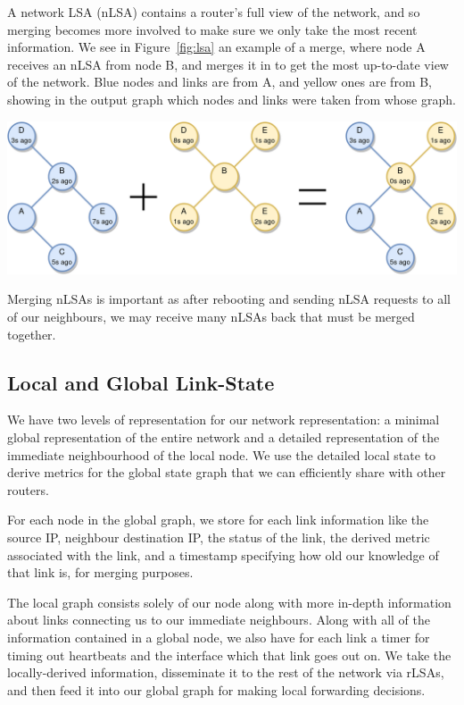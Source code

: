 \documentclass[withindex,glossary,openany]{cam-thesis}
\begin{document}
A network LSA (nLSA) contains a router's full view of the network, and so merging becomes more involved to make sure we only take the most recent information. We see in Figure~\ref{fig:lsa} an example of a merge, where node A receives an nLSA from node B, and merges it in to get the most up-to-date view of the network. Blue nodes and links are from A, and yellow ones are from B, showing in the output graph which nodes and links were taken from whose graph.

\begin{center}
\begin{minipage}{0.9\textwidth} \centering
	\includegraphics[width=1\textwidth]{lsa}
	\label{fig:lsa}
\end{minipage}
\end{center}

Merging nLSAs is important as after rebooting and sending nLSA requests to all of our neighbours, we may receive many nLSAs back that must be merged together.

\subsection{Local and Global Link-State}

We have two levels of representation for our network representation: a minimal global representation of the entire network and a detailed representation of the immediate neighbourhood of the local node. We use the detailed local state to derive metrics for the global state graph that we can efficiently share with other routers.

For each node in the global graph, we store for each link information like the source IP, neighbour destination IP, the status of the link, the derived metric associated with the link, and a timestamp specifying how old our knowledge of that link is, for merging purposes.

The local graph consists solely of our node along with more in-depth information about links connecting us to our immediate neighbours. Along with all of the information contained in a global node, we also have for each link a timer for timing out heartbeats and the interface which that link goes out on. We take the locally-derived information, disseminate it to the rest of the network via rLSAs, and then feed it into our global graph for making local forwarding decisions.
\end{document}
